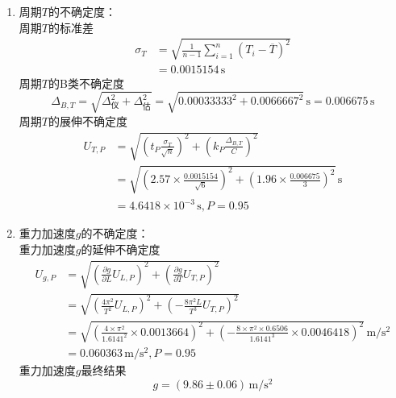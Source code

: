 \documentclass[12pt,a4paper]{article}
\begin{document}
\begin{enumerate}
                \item 周期$T$的不确定度： \\
                周期$T$的标准差
                \[
                    \begin{aligned}
                        \sigma_{T}&=\sqrt{\frac{1}{n-1}\sum_{i=1}^n\left(T_i-\overline{T}\right)^2}\\
                        &=0.0015154\,\mathrm{s}
                    \end{aligned}
                \]
                周期$T$的B类不确定度
                \[
                    \Delta_{B,T}=\sqrt{\Delta_\text{仪}^2+\Delta_\text{估}^2}=\sqrt{0.00033333^2+0.0066667^2}\,\mathrm{s}=0.006675\,\mathrm{s}
                \]
                周期$T$的展伸不确定度
                \[
                    \begin{aligned}
                        U_{T,P}&=\sqrt{\left(t_P\frac{\sigma_{T}}{\sqrt{n}}\right)^2+\left(k_P\frac{\Delta_{B,T}}{C}\right)^2}\\
                        &=\sqrt{\left(2.57\times\frac{0.0015154}{\sqrt{6}}\right)^2+\left(1.96\times\frac{0.006675}{3}\right)^2}\,\mathrm{s}\\
                        &=4.6418 \times 10^{-3}\,\mathrm{s},P=0.95
                    \end{aligned}
                \]

                \item 重力加速度$g$的不确定度： \\
                重力加速度$g$的延伸不确定度
                \[
                    \begin{aligned}
                        U_{g,P}&=\sqrt{\left(\frac{\partial g}{\partial L}U_{L,P}\right)^2+\left(\frac{\partial g}{\partial T}U_{T,P}\right)^2}\\
                        &=\sqrt{\left(\frac{4 \pi^{2}}{T^{2}}U_{L,P}\right)^2+\left(- \frac{8 \pi^{2} L}{T^{3}}U_{T,P}\right)^2}\\
                        &=\sqrt{\left(\frac{4\times \pi^2}{1.6141^2}\times 0.0013664\right)^2+\left(-\frac{8\times \pi^2\times 0.6506}{1.6141^3}\times 0.0046418\right)^2}\,\mathrm{m/s^2}\\
                        &=0.060363\,\mathrm{m/s^2},P=0.95
                    \end{aligned}
                \]
                重力加速度$g$最终结果
                \[
                    g=\left(9.86 \pm 0.06\right)\,\mathrm{m/s^2}
                \]

            \end{enumerate}
\end{document}
